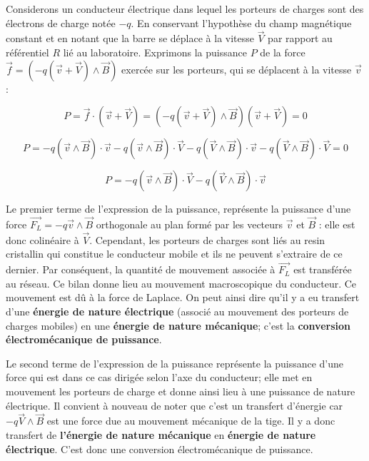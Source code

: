 \documentclass{article}
\begin{document}
Considerons un conducteur électrique dans lequel les porteurs de charges sont des électrons de charge notée $-q$. En conservant l'hypothèse du champ magnétique constant et en notant que la barre se déplace à la vitesse $\vec{V}$ par rapport au référentiel $R$ lié au laboratoire. Exprimons la puissance $P$ de la force $\vec{f}=(-q(\vec{v} + \vec{V}) \land \vec{B})$ exercée sur les porteurs, qui se déplacent à la vitesse $\vec{v}$ :

\begin{equation}
    P = \vec{f} \cdot (\vec{v} + \vec{V}) = (-q(\vec{v} + \vec{V})\land \vec{B} ) (\vec{v} + \vec{V}) = 0
\end{equation}

\begin{equation}
P = -q ( \vec{v}  \land \vec{B} ) \cdot \vec{v} -q( \vec{v}  \land \vec{B} ) \cdot \vec{V} -q ( \vec{V}  \land \vec{B} ) \cdot \vec{v} -q ( \vec{V}  \land \vec{B} ) \cdot \vec{V} = 0
\end{equation}

\begin{equation}
    P = -q (\vec{v}  \land \vec{B} ) \cdot \vec{V} -q ( \vec{V}  \land \vec{B} ) \cdot \vec{v}
\end{equation}

Le premier terme de l'expression de la puissance, représente la puissance d'une force $\vec{F_L} = -q \vec{v} \land \vec{B} $ orthogonale au plan formé par les vecteurs $\vec{v}$ et $\vec{B}$ : elle est donc colinéaire à $\vec{V}$. Cependant, les porteurs de charges sont liés au resin cristallin qui constitue le conducteur mobile et ils ne peuvent s'extraire de ce dernier. Par conséquent, la quantité de mouvement associée à $\vec{F_L}$ est transférée au réseau. Ce bilan donne lieu au mouvement macroscopique du conducteur. Ce mouvement est dû à la force de Laplace. On peut ainsi dire qu'il y a eu transfert d'une \textbf{énergie de nature électrique} (associé au mouvement des porteurs de charges mobiles) en une \textbf{énergie de nature mécanique}; c'est la \textbf{conversion électromécanique de puissance}. \medskip

Le second terme de l'expression de la puissance représente la puissance d'une force qui est dans ce cas dirigée selon l'axe du conducteur; elle met en mouvement les porteurs de charge et donne ainsi lieu à une puissance de nature électrique. Il convient à nouveau de noter que c'est un transfert d'énergie car $-q\vec{V}\land \vec{B}$ est une force due au mouvement mécanique de la tige. Il y a donc transfert de \textbf{l'énergie de nature mécanique} en \textbf{énergie de nature électrique}. C'est donc une conversion électromécanique de puissance.\medskip
\end{document}
